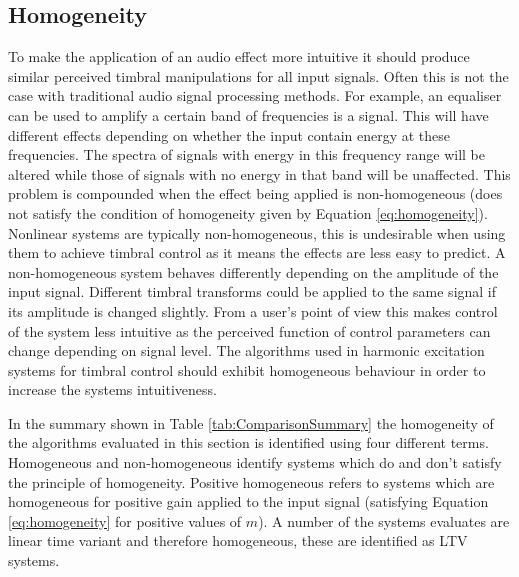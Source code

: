 	\subsection{Homogeneity}
	\label{sec:ExcitationEvaluation-Evaluation-Homogeneity}
		To make the application of an audio effect more intuitive it should produce similar perceived timbral
		manipulations for all input signals. Often this is not the case with traditional audio signal processing
		methods. For example, an equaliser can be used to amplify a certain band of frequencies is a signal. This
		will have different effects depending on whether the input contain energy at these frequencies. The spectra
		of signals with energy in this frequency range will be altered while those of signals with no energy in
		that band will be unaffected. This problem is compounded when the effect being applied is non-homogeneous
		(does not satisfy the condition of homogeneity given by Equation \ref{eq:homogeneity}).  Nonlinear systems
		are typically non-homogeneous, this is undesirable when using them to achieve timbral control as it means
		the effects are less easy to predict. A non-homogeneous system behaves differently depending on the
		amplitude of the input signal. Different timbral transforms could be applied to the same signal if its
		amplitude is changed slightly. From a user's point of view this makes control of the system less intuitive
		as the perceived function of control parameters can change depending on signal level. The algorithms used
		in harmonic excitation systems for timbral control should exhibit homogeneous behaviour in order to
		increase the systems intuitiveness.

		In the summary shown in Table \ref{tab:ComparisonSummary} the homogeneity of the algorithms evaluated in
		this section is identified using four different terms. Homogeneous and non-homogeneous identify systems
		which do and don't satisfy the principle of homogeneity. Positive homogeneous refers to systems which are
		homogeneous for positive gain applied to the input signal (satisfying Equation \ref{eq:homogeneity} for
		positive values of $m$). A number of the systems evaluates are linear time variant and therefore
		homogeneous, these are identified as LTV systems.

